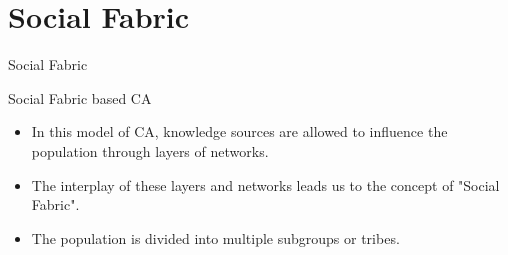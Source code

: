 \documentclass[table]{beamer}
\begin{document}
	
	\section{Social Fabric}	
	\begin{frame}{Social Fabric}
		\begin{block}{Social Fabric based CA}
			\begin{itemize}
				\item In this model of CA, knowledge sources are allowed to influence the population through layers of networks. \newline
				\item The interplay of these layers and networks leads us to the concept of "\alert{Social Fabric}". \cite{reynolds2008computing} \newline
				\item The population is divided into multiple subgroups or \alert{tribes}. \cite{ali2016leveraged}
			\end{itemize}
		\end{block}
	\end{frame}
	
\end{document}
